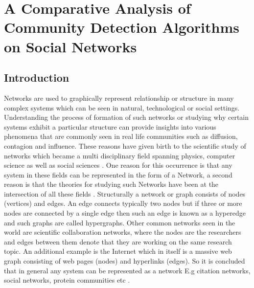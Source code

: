 
\chapter{A Comparative Analysis of Community Detection Algorithms on Social Networks}



\section{Introduction}

\indent  Networks are used to graphically represent relationship or structure in many complex systems which can be seen in natural, technological or social settings. Understanding the process of formation of such networks or studying why certain systems exhibit a particular structure can provide insights into various phenomena that are commonly seen in real life communities such as diffusion, contagion and influence. These reasons have given birth to the scientific study of networks which became a multi disciplinary field spanning physics, computer science as well as social sciences \cite{aps:1} \cite{aps:2}. One reason for this occurrence is that any system in these fields can be represented in the form of a Network, a second reason is that the theories for studying such Networks have been at the intersection of all these fields \cite{aps:24}. Structurally a network or graph consists of nodes (vertices) and edges. An edge connects typically two nodes but if three or more nodes are connected by a single edge then such an edge is known as a hyperedge and such graphs are called hypergraphs. Other common networks seen in the world are scientific collaboration networks, where the nodes are the researchers and edges between them denote that they are working on the same research topic. An additional example is the Internet which in itself is a massive web graph consisting of web pages (nodes) and hyperlinks (edges). So it is concluded that in general any system can be represented as a network E.g citation networks, social networks, protein communities etc \cite{aps:24}. \\

